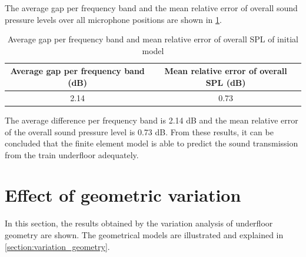 The average gap per frequency band and the mean relative error of overall sound pressure levels over all microphone positions are shown in \cref{tab:average_gap}.
\begin{table}%
	\centering
	\caption{Average gap per frequency band and mean relative error of overall SPL of initial model}
	\begin{tabular}{c|c}
		Average gap per  frequency band (dB) & Mean relative error of overall SPL (dB) \\ \hline
		2.14 & 0.73
	\end{tabular}
	\label{tab:average_gap}
\end{table}
The average difference per frequency band is 2.14 dB and the mean relative error of the overall sound pressure level is 0.73 dB. From these results, it can be concluded that the finite element model is able to predict the sound transmission from the train underfloor adequately.


\section{Effect of geometric variation}

In this section, the results obtained by the variation analysis of underfloor geometry are shown. The geometrical models are illustrated and explained in \cref{section:variation_geometry}.

